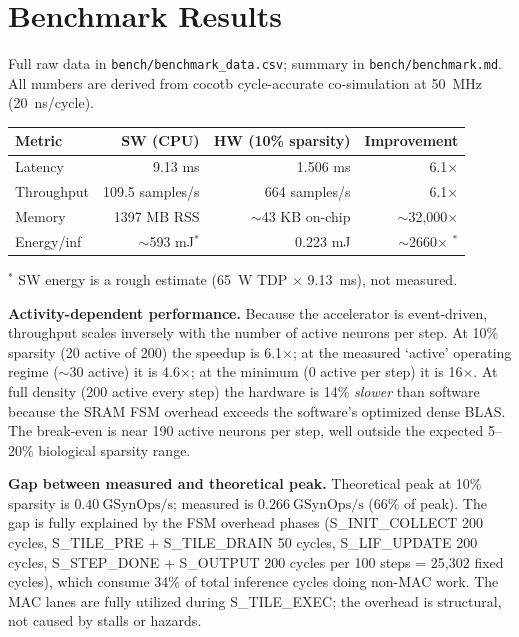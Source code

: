 \documentclass[11pt,letterpaper]{article}
\begin{document}
\section{Benchmark Results}

Full raw data in \texttt{bench/benchmark\_data.csv}; summary in
\texttt{bench/benchmark.md}. All numbers are derived from cocotb cycle-accurate
co-simulation at 50~MHz (20~ns/cycle).

\begin{center}
\begin{tabular}{lrrr}
\toprule
Metric & SW (CPU) & HW (10\% sparsity) & Improvement \\
\midrule
Latency & 9.13 ms & 1.506 ms & 6.1$\times$ \\
Throughput & 109.5 samples/s & 664 samples/s & 6.1$\times$ \\
Memory & 1397 MB RSS & $\sim$43 KB on-chip & $\sim$32{,}000$\times$ \\
Energy/inf & $\sim$593 mJ$^*$ & 0.223 mJ & $\sim$2660$\times$ $^*$ \\
\bottomrule
\end{tabular}
\end{center}
$^*$ SW energy is a rough estimate (65~W TDP $\times$ 9.13~ms), not measured.

\textbf{Activity-dependent performance.}
Because the accelerator is event-driven, throughput scales inversely with the
number of active neurons per step. At 10\% sparsity (20 active of 200) the
speedup is 6.1$\times$; at the measured `active' operating regime ($\sim$30
active) it is 4.6$\times$; at the minimum (0 active per step) it is 16$\times$.
At full density (200 active every step) the hardware is 14\% \emph{slower} than
software because the SRAM FSM overhead exceeds the software's optimized dense
BLAS. The break-even is near 190 active neurons per step, well outside the
expected 5--20\% biological sparsity range.

\textbf{Gap between measured and theoretical peak.}
Theoretical peak at 10\% sparsity is $0.40\ \text{GSynOps/s}$; measured is
$0.266\ \text{GSynOps/s}$ (66\% of peak). The gap is fully explained by the
FSM overhead phases (S\_INIT\_COLLECT 200 cycles, S\_TILE\_PRE + S\_TILE\_DRAIN
50 cycles, S\_LIF\_UPDATE 200 cycles, S\_STEP\_DONE + S\_OUTPUT 200 cycles per
100 steps = 25,302 fixed cycles), which consume 34\% of total inference cycles
doing non-MAC work. The MAC lanes are fully utilized during S\_TILE\_EXEC; the
overhead is structural, not caused by stalls or hazards.
\end{document}
